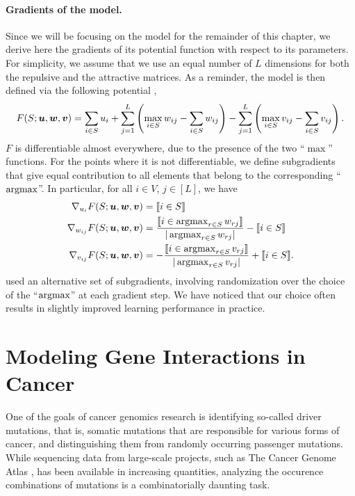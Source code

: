 \paragraph{Gradients of the \fldc{} model.}
Since we will be focusing on the \fldc{} model for the remainder of this chapter, we derive here the gradients of its potential function with respect to its parameters.
For simplicity, we assume that we use an equal number of $L$ dimensions for both the repulsive and the attractive matrices.
As a reminder, the \fldc{} model is then defined via the following potential \citep{djolonga16mixed},
\begin{align*}
F(S; \bm{u}, \bm{w}, \bm{v}) = \sum_{i \in S} u_i + \sum_{j=1}^{L} \left(\max_{i \in S} w_{ij} - \sum_{i \in S} w_{ij}\right) - \sum_{j=1}^{L} \left(\max_{i \in S} v_{ij} - \sum_{i \in S} v_{ij}\right).
\end{align*}
$F$ is differentiable almost everywhere, due to the presence of the two ``$\max$'' functions.
For the points where it is not differentiable, we define subgradients that give equal contribution to all elements that belong to the corresponding ``$\argmax$''.
In particular, for all $i \in V$, $j \in [L]$, we have
\begin{align*}
\nabla_{u_i} F(S; \bu, \bw, \bv) &= \llbracket i \in S\rrbracket\\
\nabla_{w_{ij}} F(S; \bu, \bw, \bv) &= \frac{\llbracket i \in \argmax_{r \in S} w_{rj}\rrbracket}{|\argmax_{r \in S} w_{rj}|} - \llbracket i \in S\rrbracket\\
\nabla_{v_{ij}} F(S; \bu, \bw, \bv) &= -\frac{\llbracket i \in \argmax_{r \in S} v_{rj}\rrbracket}{|\argmax_{r \in S} v_{rj}|} + \llbracket i \in S\rrbracket.
\end{align*}
\citet{tschiatschek16} used an alternative set of subgradients, involving randomization over the choice of the ``$\argmax$'' at each gradient step.
We have noticed that our choice often results in slightly improved learning performance in practice.


\section{Modeling Gene Interactions in Cancer}
One of the goals of cancer genomics research is identifying so-called driver mutations, that is, somatic mutations that are responsible for various forms of cancer, and distinguishing them from randomly occurring passenger mutations.
While sequencing data from large-scale projects, such as The Cancer Genome Atlas \citep{tcga}, has been available in increasing quantities, analyzing the occurence combinations of mutations is a combinatorially daunting task.

